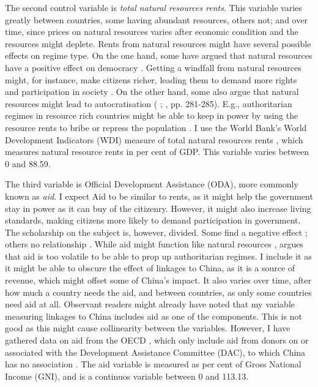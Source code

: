 The second control variable is \textit{total natural resources rents}. This variable varies greatly between countries, some having abundant resources, others not; and over time, since prices on natural resources varies after economic condition and the resources might deplete. Rents from natural resources might have several possible effects on regime type. On the one hand, some have argued that natural resources have a positive effect on democracy \citep{brooks_oil_2016, haber_natural_2011}. Getting a windfall from natural resources might, for instance, make citizens richer, leading them to demand more rights and participation in society \citep{brooks_oil_2016, lipset_social_1959}. On the other hand, some also argue that natural resources might lead to autocratisation (\citeauthor{andersen_big_2014} \citeyear{andersen_big_2014}; \citeauthor{brooks_oil_2016} \citeyear{brooks_oil_2016}, pp. 281-285). E.g., authoritarian regimes in resource rich countries might be able to keep in power by using the resource rents to bribe or repress the population \citep[p. 282]{brooks_oil_2016}. I use the World Bank's World Development Indicators (WDI) measure of total natural resources rents \citet{world_bank_world_2025}, which measures natural resource rents in per cent of GDP. This variable varies between 0 and 88.59. 

The third variable is Official Development Assistance (ODA), more commonly known as \textit{aid}. I expect Aid to be similar to rents, as it might help the government stay in power as it can buy of the citizenry. However, it might also increase living standards, making citizens more likely to demand participation in government. The scholarship on the subject is, however, divided. Some find a negative effect \citep{djankov_curse_2008}; others no relationship \citep{altincekic_why_2014}. While aid might function like natural resources \citep{djankov_curse_2008}, \citet[p. 30]{altincekic_why_2014} argues that aid is too volatile to be able to prop up authoritarian regimes. I include it as it might be able to obscure the effect of linkages to China, as it is a source of revenue, which might offset some of China's impact. It also varies over time, after how much a country needs the aid, and between countries, as only some countries need aid at all. Observant readers might already have noted that my variable measuring linkages to China includes aid as one of the components. This is not good as this might cause collinearity between the variables. However, I have gathered data on aid from the OECD \citep{oecd_dac2a_2025}, which only include aid from donors on or associated with the Development Assistance Committee (DAC), to which China has no association \citep{oecd_development_2025}. The aid variable is measured as per cent of Gross National Income (GNI), and is a continuos variable between 0 and 113.13. 


